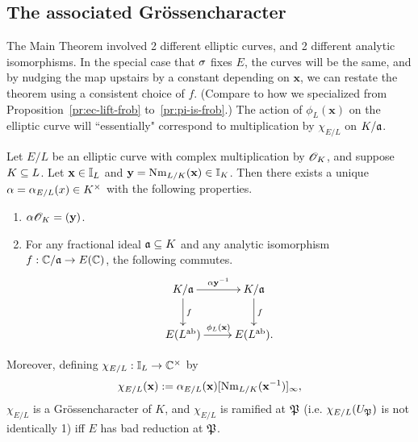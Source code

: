 \subsection{The associated Gr\"ossencharacter}
The Main Theorem involved 2 different elliptic curves, and 2 different analytic isomorphisms.
In the special case that $\sigma$ fixes $E$, the curves will be the same, and by nudging the map upstairs by a constant depending on $\mathbf x$, we can restate the theorem using a consistent choice of $f$. (Compare to how we specialized from Proposition~\ref{pr:ec-lift-frob} to~\ref{pr:pi-is-frob}.) 
The action of $\phi_L(\mathbf x)$ on the elliptic curve will ``essentially" correspond to multiplication by $\chi_{E/L}$ on $K/\mathfrak{a}$. 
\begin{thm}
Let $E/L$ be an elliptic curve with complex multiplication by $\mathscr{O}_K$, and suppose $K\subseteq L$. Let $\mathbf x\in \mathbb{I}_L$ and $\mathbf y=\operatorname{Nm}_{L/K}(\mathbf x)\in \mathbb{I}_K$. Then there exists a unique $\alpha=\alpha_{E/L}(x)\in K^{\times}$ with the following properties.
\begin{enumerate}
\item
$\alpha\mathscr{O}_K=(\mathbf y)$. %
\item
For any fractional ideal $\mathfrak{a}\subseteq K$ and any analytic isomorphism $f:\mathbb{C}/\mathfrak{a}\to E(\mathbb{C})$, the following commutes.
\[
\xymatrix{
K/\ma \ar[r]^{\al \mathbf y^{-1}}\ar[d]^f & K/\ma \ar[d]^f\\
E(L\abe)\ar[r]^{\phi_L(\mathbf x)} & E(L\abe).
}
\]
\end{enumerate}

Moreover, defining $\chi_{E/L}:\mathbb{I}_L\to \mathbb{C}^{\times}$ by
\[
\chi_{E/L}(\mathbf x):=\alpha_{E/L}(\mathbf x)[\operatorname{Nm}_{L/K}(\mathbf{x}^{-1})]_{\infty},
\]
$\chi_{E/L}$ is a Gr\"ossencharacter of $K$, and $\chi_{E/L}$ is ramified at $\mathfrak{P}$ (i.e. $\chi_{E/L}(U_{\mathfrak{P}})$ is not identically 1) iff $E$ has bad reduction at $\mathfrak{P}$.
\end{thm}
%
